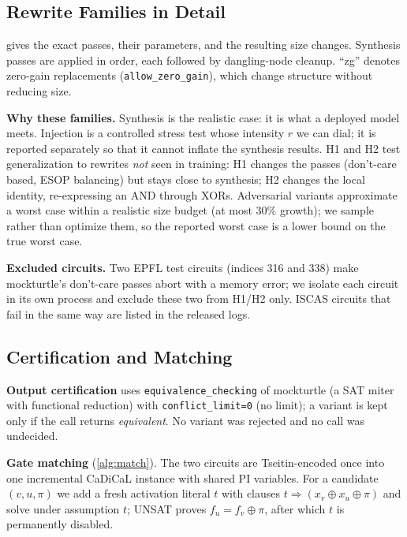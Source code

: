 \FloatBarrier
\subsection{Rewrite Families in Detail}\label{app:families}

 gives the exact passes, their parameters, and the resulting size changes. Synthesis
passes are applied in order, each followed by dangling-node cleanup. ``zg'' denotes zero-gain replacements
(\texttt{allow\_zero\_gain}), which change structure without reducing size.

\noindent\textbf{Why these families.} Synthesis is the realistic case: it is what a deployed model meets.
Injection is a controlled stress test whose intensity $r$ we can dial; it is reported separately so that it
cannot inflate the synthesis results. H1 and H2 test generalization to rewrites \emph{not} seen in training: H1
changes the passes (don't-care based, ESOP balancing) but stays close to synthesis; H2 changes the local
identity, re-expressing an AND through XORs. Adversarial variants approximate a worst case within a realistic
size budget (at most 30\% growth); we sample rather than optimize them, so the reported worst case is a lower
bound on the true worst case.

\noindent\textbf{Excluded circuits.} Two EPFL test circuits (indices 316 and 338) make mockturtle's
don't-care passes abort with a memory error; we isolate each circuit in its own process and exclude these two
from H1/H2 only. ISCAS circuits that fail in the same way are listed in the released logs.

\FloatBarrier
\subsection{Certification and Matching}\label{app:matching}
\noindent\textbf{Output certification} uses \texttt{equivalence\_checking} of mockturtle (a SAT miter with
functional reduction) with \texttt{conflict\_limit=0} (no limit); a variant is kept only if the call returns
\emph{equivalent}. No variant was rejected and no call was undecided.


\noindent\textbf{Gate matching} (\cref{alg:match}). The two circuits are Tseitin-encoded once into one
incremental CaDiCaL instance with shared PI variables. For a candidate $(v,u,\pi)$ we add a fresh activation
literal $t$ with clauses $t\Rightarrow (x_v\oplus x_u\oplus\pi)$ and solve under assumption $t$; UNSAT proves
$f_u=f_v\oplus\pi$, after which $t$ is permanently disabled.

